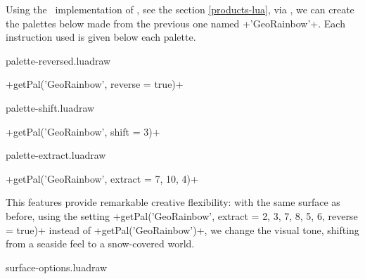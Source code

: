 \documentclass{tutodoc}
\begin{document}
\begin{tdocnote}
    Using the \lua\ implementation of \thisproj, see the section \ref{products-lua}, via \LUADRAW, we can create the palettes below made from the previous one named +'GeoRainbow'+. Each instruction used is given below each palette.
    \begin{center}
        {palette-reversed.luadraw}

        +getPal('GeoRainbow', {reverse = true})+

        \smallskip
        {palette-shift.luadraw}

        +getPal('GeoRainbow', {shift = 3})+

        \smallskip
        {palette-extract.luadraw}

        +getPal('GeoRainbow', {extract = {7, 10, 4}})+
    \end{center}

    \smallskip
    
    This features provide remarkable creative flexibility: with the same surface as before, using the setting
    +getPal('GeoRainbow', {extract = {2, 3, 7, 8, 5, 6}, reverse = true})+
    instead of 
    +getPal('GeoRainbow')+,
    we change the visual tone, shifting from a seaside feel to a snow-covered world.
    \begin{center}
        {surface-options.luadraw}
    \end{center}
\end{tdocnote}
\end{document}

